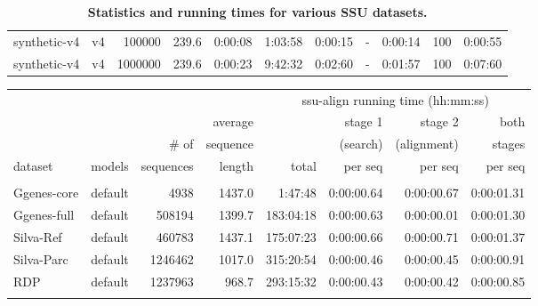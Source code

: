 \begin{table}[hb]
\begin{center}
\begin{tabular}{llrr|rrrrr|rr}
synthetic-v4    & v4       &  100000 &  239.6 &   0:00:08 &   1:03:58 &   0:00:15 &         - &   0:00:14 & 100 &   0:00:55 \\%
synthetic-v4    & v4       & 1000000 &  239.6 &   0:00:23 &   9:42:32 &   0:02:60 &         - &   0:01:57 & 100 &   0:07:60 \\%
\end{tabular}
\label{tbl:ttimes}
\caption{\textbf{Statistics and running times for various SSU datasets.}}
\end{center}
\end{table}

\begin{table}[hb]
\begin{center}
  \small
  \begin{tabular}{llrr|rrrr} 
                &          &         &        &  \multicolumn{4}{c}{ssu-align running time (hh:mm:ss)} \\ \cline{5-8}
                &          &         &average &           & stage 1      & stage 2      & both   \\ 
                &          &\# of    &sequence&           & (search)     & (alignment)  & stages \\ 
dataset         & models   &sequences& length & total     & per seq      & per seq      & per seq     \\ \hline
& & & & & & & \\
Ggenes-core     & default  &    4938 & 1437.0 &   1:47:48 &   0:00:00.64 &   0:00:00.67 &   0:00:01.31 \\
Ggenes-full     & default  &  508194 & 1399.7 & 183:04:18 &   0:00:00.63 &   0:00:00.01 &   0:00:01.30 \\
Silva-Ref       & default  &  460783 & 1437.1 & 175:07:23 &   0:00:00.66 &   0:00:00.71 &   0:00:01.37 \\
Silva-Parc      & default  & 1246462 & 1017.0 & 315:20:54 &   0:00:00.46 &   0:00:00.45 &   0:00:00.91 \\
RDP             & default  & 1237963 &  968.7 & 293:15:32 &   0:00:00.43 &   0:00:00.42 &   0:00:00.85 \\
& & & & & & & \\

\end{tabular}
\end{center}
\end{table}
